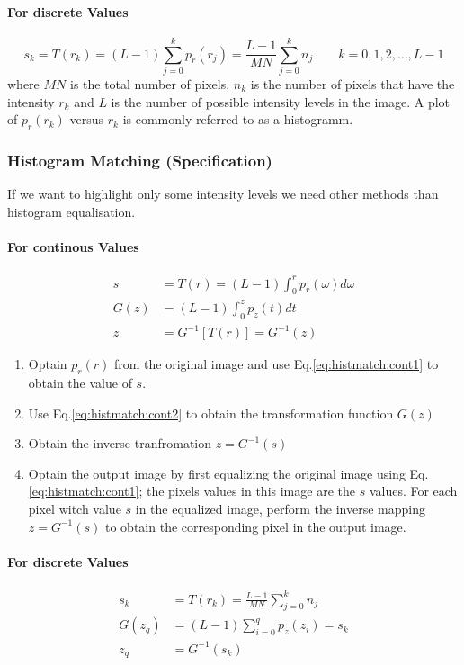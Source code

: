 \paragraph{For discrete Values}
\begin{equation}
	s_k = T(r_k) = (L-1) \sum_{j=0}^k p_r(r_j) = \frac{L-1}{MN} \sum_{j=0}^k n_j \qquad k = 0,1,2,\ldots, L-1
\end{equation}
where $MN$ is the total number of pixels, $n_k$ is the number of pixels that have the intensity $r_k$ and $L$ is the number of possible intensity levels in the image.
A plot of $p_r(r_k)$ versus $r_k$ is commonly referred to as a histogramm.


\subsubsection{Histogram Matching (Specification)}
If we want to highlight only some intensity levels we need other methods than histogram equalisation.

\paragraph{For continous Values}
\begin{align}
	s	&= T(r) = (L-1) \int_0^r p_r(\omega) d\omega \label{eq:histmatch:cont1} \\
	G(z)&= (L-1) \int_0^z p_z(t) dt \label{eq:histmatch:cont2} \\
	z 	&= G^{-1}[T(r)] = G^{-1}(z) \label{eq:histmatch:cont3}
\end{align}

\begin{enumerate}
  \item Optain $p_r(r)$ from the original image and use Eq.\ref{eq:histmatch:cont1} to obtain the value of $s$.
  \item Use Eq.\ref{eq:histmatch:cont2} to obtain the transformation function $G(z)$
  \item Obtain the inverse tranfromation $z = G^{-1}(s)$
  \item Optain the output image by first equalizing the original image using Eq.\ref{eq:histmatch:cont1}; the pixels values in this image are the $s$ values.
  	For each pixel witch value $s$ in the equalized image, perform the inverse mapping $z = G^{-1}(s)$ to obtain the corresponding pixel in the output image. 
\end{enumerate}

\paragraph{For discrete Values}
\begin{align}
	s_k		&= T(r_k) = \frac{L-1}{MN}\sum_{j=0}^{k} n_j \label{eq:histmatch:disc1} \\
	G(z_q)	&= (L-1) \sum_{i=0}^q p_z(z_i) = s_k \label{eq:histmatch:disc2}  \\
	z_q 	&= G^{-1}(s_k)	 
\end{align}

